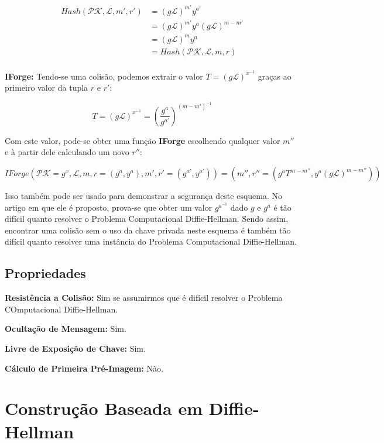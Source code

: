 \documentclass[a4paper]{article}
\begin{document}
\begin{equation}
\begin{split}
  Hash(\mathcal{PK},\mathcal{L}, m', r') &= (g\mathcal{L})^{m'}y^{a'}\\
  &= (g\mathcal{L})^{m'}y^{a}(g\mathcal{L})^{m-m'}\\
  &= (g\mathcal{L})^{m}y^{a}\\
  &= Hash(\mathcal{PK},\mathcal{L}, m, r)\\
\end{split}
\end{equation}

\textbf{IForge:} Tendo-se uma colisão, podemos extrair o valor $T =
(g\mathcal{L})^{x^{-1}}$ graças ao primeiro valor da tupla $r$ e $r'$:

$$
T = (g\mathcal{L})^{x^{-1}} = \left(\frac{g^a}{g^{a'}}\right)^{(m-m')^{-1}}
$$

Com este valor, pode-se obter uma função \textbf{IForge} escolhendo
qualquer valor $m''$ e à partir dele calculando um novo $r''$:

$$ IForge(\mathcal{PK}=g^x, \mathcal{L}, m, r=(g^a, y^a), m',
r'=(g^{a'}, y^{a'})) = (m'', r''=(g^aT^{m-m''},
y^{a}(g\mathcal{L})^{m-m''}))
$$

Isso também pode ser usado para demonstrar a segurança deste
esquema. No artigo em que ele é proposto, prova-se que obter um valor
$g^{a^{-1}}$ dado $g$ e $g^a$ é tão difícil quanto resolver o Problema
Computacional Diffie-Hellman. Sendo assim, encontrar uma colisão sem o
uso da chave privada neste esquema é também tão difícil quanto
resolver uma instância do Problema Computacional Diffie-Hellman.

\subsection{Propriedades}

\textbf{Resistência a Colisão: }Sim se assumirmos que é difícil resolver o Problema COmputacional Diffie-Hellman.

\textbf{Ocultação de Mensagem: }Sim.

\textbf{Livre de Exposição de Chave: } Sim.

\textbf{Cálculo de Primeira Pré-Imagem: }Não.

\section{Construção Baseada em Diffie-Hellman \cite{ateniese}}
\end{document}
